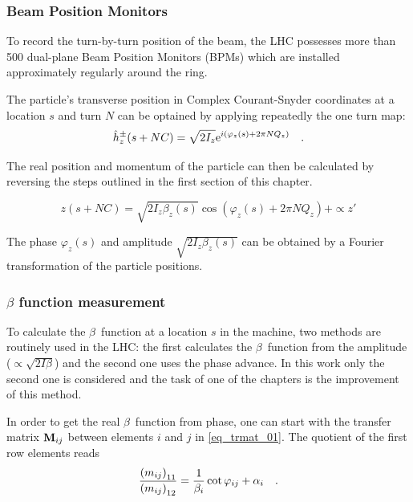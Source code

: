 

\subsubsection{Beam Position Monitors}

To record the turn-by-turn position of the beam, the LHC possesses more than 500 dual-plane
Beam Position Monitors (BPMs) which are installed approximately regularly around the ring. 

The particle's transverse position in Complex Courant-Snyder coordinates at a location $s$ and turn
$N$ can be optained by applying repeatedly the one turn map:
\begin{equation}
    \hat{h}_z^\pm(s + NC) = \sqrt{2I_z} \text{e}^{i \left( \varphi_z(s) + 2\pi N Q_z\right)} 
    \quad .
\end{equation}

The real position and momentum of the particle can then be calculated by reversing the steps outlined
in the first section of this chapter.

\begin{equation}
    z(s + NC) = \sqrt{2I_z\beta_z(s)}\cos \left( \varphi_z(s) + 2\pi N Q_z\right) + \propto z'
\end{equation}

The phase $\varphi_z(s)$ and amplitude $\sqrt{2I_z\beta_z(s)}$ can be obtained by a Fourier transformation of
the particle positions.



\subsubsection{$\beta$ function measurement}
\label{sec_beta_meas}

To calculate the $\beta$~function at a location $s$ in the machine, two methods are routinely used
in the LHC: the first calculates the $\beta$~function from the amplitude ($\propto \sqrt{2I\beta}$)
and the second one uses the phase advance.
In this work only the second one is considered and the task of one of the chapters is the improvement
of this method.

In order to get the real $\beta$~function from phase, one can start with the transfer matrix $\mathbf{M}_{ij}$
between elements $i$ and $j$ in \eqref{eq_trmat_01}.
The quotient of the first row elements reads 
\begin{equation}
    \frac{\left(m_{ij}\right)_{11}}{\left(m_{ij}\right)_{12}} =
    \frac{1}{\beta_i} \cot\varphi_{ij} + \alpha_i
    \quad .
\end{equation}

